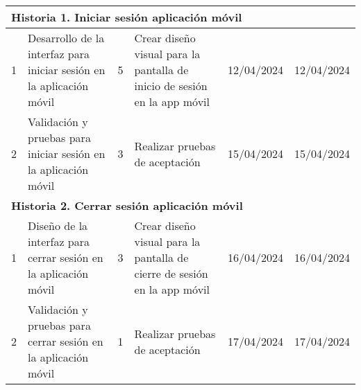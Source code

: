 \begin{longtable}{|p{0.5cm}|p{2cm}|p{1cm}|p{3cm}|p{1cm}|p{1cm}|}
    \multicolumn{6}{|l|}{\textbf{Historia 1. Iniciar sesión aplicación móvil}}                                                                                                                                                                                                                                                                                                                                   \\ \hline
    1                                        & Desarrollo de la interfaz para iniciar sesión en la aplicación móvil         & 5                                                              & Crear diseño visual para la pantalla de inicio de sesión en la app móvil    & 12/04/2024                                                    & 12/04/2024                                                          \\ \hline
    2                                        & Validación y pruebas para iniciar sesión en la aplicación móvil              & 3                                                              & Realizar pruebas de aceptación                                              & 15/04/2024                                                    & 15/04/2024                                                          \\ \hline
    \multicolumn{6}{|l|}{\textbf{Historia 2. Cerrar sesión aplicación móvil}}                                                                                                                                                                                                                                                                                                                                    \\ \hline
    1                                        & Diseño de la interfaz para cerrar sesión en la aplicación móvil              & 3                                                              & Crear diseño visual para la pantalla de cierre de sesión en la app móvil    & 16/04/2024                                                    & 16/04/2024                                                          \\ \hline
    2                                        & Validación y pruebas para cerrar sesión en la aplicación móvil               & 1                                                              & Realizar pruebas de aceptación                                              & 17/04/2024                                                    & 17/04/2024                                                          \\ \hline

\end{longtable}
